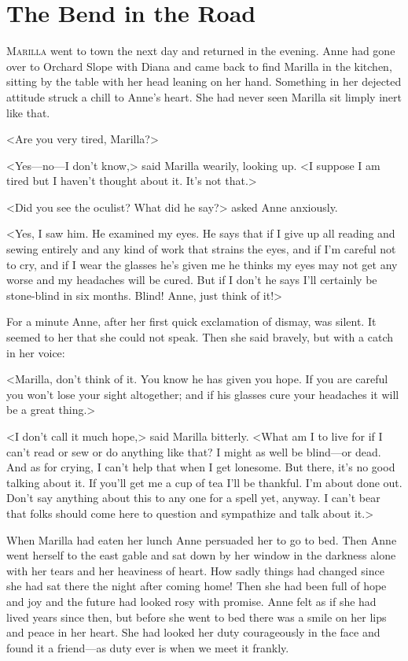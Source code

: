 \chapter{The Bend in the Road}

\lettrine[]{M}{arilla} went to town the next day and returned in the evening. Anne had gone over to Orchard Slope with Diana and came back to find Marilla in the kitchen, sitting by the table with her head leaning on her hand. Something in her dejected attitude struck a chill to Anne's heart. She had never seen Marilla sit limply inert like that.

<Are you very tired, Marilla?>

<Yes—no—I don't know,> said Marilla wearily, looking up. <I suppose I am tired but I haven't thought about it. It's not that.>

<Did you see the oculist? What did he say?> asked Anne anxiously.

<Yes, I saw him. He examined my eyes. He says that if I give up all reading and sewing entirely and any kind of work that strains the eyes, and if I'm careful not to cry, and if I wear the glasses he's given me he thinks my eyes may not get any worse and my headaches will be cured. But if I don't he says I'll certainly be stone-blind in six months. Blind! Anne, just think of it!>

For a minute Anne, after her first quick exclamation of dismay, was silent. It seemed to her that she could not speak. Then she said bravely, but with a catch in her voice:

<Marilla, don't think of it. You know he has given you hope. If you are careful you won't lose your sight altogether; and if his glasses cure your headaches it will be a great thing.>

<I don't call it much hope,> said Marilla bitterly. <What am I to live for if I can't read or sew or do anything like that? I might as well be blind—or dead. And as for crying, I can't help that when I get lonesome. But there, it's no good talking about it. If you'll get me a cup of tea I'll be thankful. I'm about done out. Don't say anything about this to any one for a spell yet, anyway. I can't bear that folks should come here to question and sympathize and talk about it.>

When Marilla had eaten her lunch Anne persuaded her to go to bed. Then Anne went herself to the east gable and sat down by her window in the darkness alone with her tears and her heaviness of heart. How sadly things had changed since she had sat there the night after coming home! Then she had been full of hope and joy and the future had looked rosy with promise. Anne felt as if she had lived years since then, but before she went to bed there was a smile on her lips and peace in her heart. She had looked her duty courageously in the face and found it a friend—as duty ever is when we meet it frankly.


